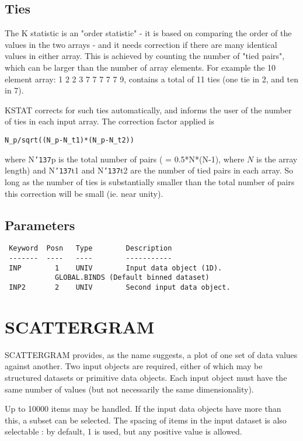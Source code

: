 \documentclass{book}
\renewcommand{\_}{{\tt\char'137}}     %
\begin{document}
\subsection{Ties}
The K statistic is an "order statistic" - it is based on comparing
the order of the values in the two arrays - and it needs correction
if there are many identical values in either array. This is achieved
by counting the number of "tied pairs", which can be larger than the
number of array elements. For example the 10 element array: 1 2 2 3
7 7 7 7 7 9, contains a total of 11 ties (one tie in 2, and ten in 7).

KSTAT corrects for such ties automatically, and informs the user of
the number of ties in each input array. The correction factor applied
is
\begin{verbatim}
N_p/sqrt((N_p-N_t1)*(N_p-N_t2))
\end{verbatim}
where N\_p is the total number of pairs ( = 0.5*N*(N-1), where
$N$ is the array length) and N\_t1 and N\_t2
are the number of tied pairs in each array. So long as the number of ties
is substantially smaller than the total number of pairs this correction
will be small (ie. near unity).

\subsection{Parameters}
\begin{verbatim}
 Keyword  Posn   Type        Description
 -------  ----   ----        -----------
 INP        1    UNIV        Input data object (1D).
            GLOBAL.BINDS (Default binned dataset)
 INP2       2    UNIV        Second input data object.

\end{verbatim}\section{SCATTERGRAM}
SCATTERGRAM provides, as the name suggests, a plot of one
set of data values against another. Two input objects are
required, either of which may be structured datasets or
primitive data objects. Each input object must have the
same number of values (but not necessarily the same
dimensionality).

Up to 10000 items may be handled. If the input data objects
have more than this, a subset can be selected. The spacing
of items in the input dataset is also selectable : by
default, 1 is used, but any positive value is allowed.
\end{document}
